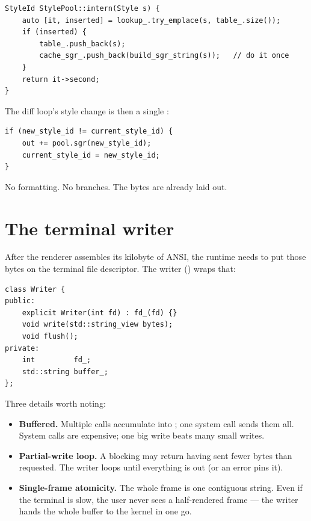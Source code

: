 \begin{lstlisting}
StyleId StylePool::intern(Style s) {
    auto [it, inserted] = lookup_.try_emplace(s, table_.size());
    if (inserted) {
        table_.push_back(s);
        cache_sgr_.push_back(build_sgr_string(s));   // do it once
    }
    return it->second;
}
\end{lstlisting}

The diff loop's style change is then a single :

\begin{lstlisting}
if (new_style_id != current_style_id) {
    out += pool.sgr(new_style_id);
    current_style_id = new_style_id;
}
\end{lstlisting}

No formatting. No branches. The bytes are already laid out.

\section{The terminal writer}

After the renderer assembles its kilobyte of ANSI, the runtime needs
to put those bytes on the terminal file descriptor. The writer
() wraps that:

\begin{lstlisting}
class Writer {
public:
    explicit Writer(int fd) : fd_(fd) {}
    void write(std::string_view bytes);
    void flush();
private:
    int         fd_;
    std::string buffer_;
};
\end{lstlisting}

Three details worth noting:

\begin{itemize}[leftmargin=*]
  \item \textbf{Buffered.} Multiple  calls accumulate
    into ; one  system call
    sends them all. System calls are expensive; one big write beats
    many small writes.
  \item \textbf{Partial-write loop.} A blocking  may
    return having sent fewer bytes than requested. The writer loops
    until everything is out (or an error pins it).
  \item \textbf{Single-frame atomicity.} The whole frame is one
    contiguous string. Even if the terminal is slow, the user never
    sees a half-rendered frame --- the writer hands the whole
    buffer to the kernel in one go.
\end{itemize}

